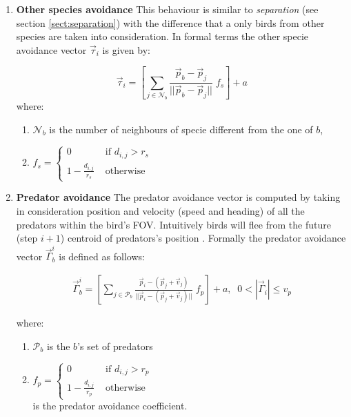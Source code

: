 \begin{enumerate}
	\item \textbf{Other species avoidance}
	\label{sect:otherSpecieAvoidance}
	This behaviour is similar to \textit{separation} (see section \ref{sect:separation}) with the difference that a only birds from other species are taken into consideration. In formal terms the other specie avoidance vector  \(\vec{\tau}_i\) is given by:
	
	\begin{equation}
	\vec{\tau}_i = 
	\left[\sum_{j \in \mathcal{N}_b}{\frac{\vec{p}_b -\vec{p}_j}{||\vec{p}_b - \vec{p}_j||}} \;f_s\right] + a 
	\end{equation}
	where:
	
	\begin{enumerate}
		\item \(\mathcal{N}_b\) is the number of neighbours of specie different from the one of $b$,
		
		\item $
		f_s = \begin{cases}
		0 &\mbox{ if }  d_{i,j} > r_s\\
		1 - \frac{d_{i,j}}{r_s} &\mbox{ otherwise}
		\end{cases}$
	\end{enumerate}
	
	
	\item \textbf{Predator avoidance}
	\label{sect:predatorAvoidance}
	The predator avoidance vector is computed by taking in consideration position and velocity (speed and heading) of all the  predators within the bird's FOV. Intuitively birds will flee from the future (step $i+1$) centroid of predators's position \cite{Laird}. Formally the predator avoidance vector $\vec{\Gamma}_b^i$ is defined as follows:
	
	\begin{align}
	\vec{\Gamma}_b^i = \left[\sum_{j \in \mathcal{P}_b }{\frac{\vec{p}_i -
			(\vec{p}_j+\vec{v}_j)}{||\vec{p}_i - (\vec{p}_j+\vec{v}_j)||}} \;f_{p}\right] +
	a, \;\;0 < |\vec{\Gamma}_i| \leq v_p
	\end{align}
	
	where:
	
	\begin{enumerate}
		\item \(\mathcal{P}_b\) is the $b$'s set of predators
		\item $	f_{p} = \begin{cases}
		0 &\mbox{ if }  d_{i,j} > r_p\\
		1 - \frac{d_{i,j}}{r_p} & \mbox{ otherwise}
		\end{cases}
		$ \hfill \\
		is the predator avoidance coefficient.
	\end{enumerate}
\end{enumerate}

